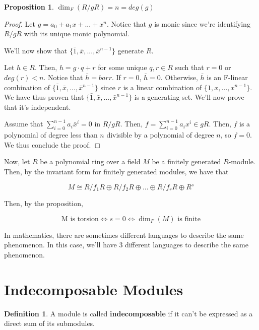 \documentclass{article}
\theoremstyle{definition}
\newtheorem{definition}{Definition}
\newtheorem{proposition}[theorem]{Proposition}
\begin{document}
\begin{proposition}
    \( \dim_{F}(R/gR) = n = deg(g)\)
\end{proposition}
\begin{proof}
    Let $g = a_{0} + a_{1}x + ... + x^{n}$. Notice that $g$ is monic since we're identifying $R/gR$ with its unique monic polynomial. 
    
    We'll now show that \( \{ \bar{1}, \bar{x}, ..., \bar{x}^{n-1}\}\) generate $R$.

    Let $h \in R$. Then, $h = g \cdot q + r$ for some unique $q,r \in R$ such that $r = 0$ or $deg(r) < n$. Notice that $\bar{h} = bar{r}$. If $r = 0$, $\bar{h} = 0$. Otherwise, $\bar{h}$ is an F-linear combination of  \( \{ \bar{1}, \bar{x}, ..., \bar{x}^{n-1}\}\) since $r$ is a linear combination of  \( \{ {1}, {x}, ..., {x^{n-1}}\}\). We have thus proven that \( \{ \bar{1}, \bar{x}, ..., \bar{x}^{n-1}\}\) is a generating set. We'll now prove that it's independent.

    Assume that \( \sum_{i = 0}^{n-1} a_{i}\bar{x}^{i} = 0\) in $R/gR$. Then,  \( f = \sum_{i = 0}^{n-1} a_{i}{x}^{i} \in gR\). Then, $f$ is a polynomial of degree less than $n$ divisible by a polynomial of degree $n$, so $f = 0$. We thus conclude the proof.
\end{proof}

Now, let $R$ be a polynomial ring over a field $M$ be a finitely generated $R$-module. Then, by the invariant form for finitely generated modules, we have that

\[ M \cong R/f_{1}R \oplus R/f_{2}R \oplus ... \oplus R/f_{r}R \oplus R^{s} \]

Then, by the proposition,

\[ \text{M is torsion} \iff s = 0 \iff \dim_{F}(M) \text{ is finite}\]

In mathematics, there are sometimes different languages to describe the same phenomenon. In this case, we'll have 3 different languages to describe the same phenomenon.

\section{Indecomposable Modules}

\begin{definition}
    A module is called \textbf{indecomposable} if it can't be expressed as a direct sum of its submodules.
\end{definition}

\newpage
\end{document}
